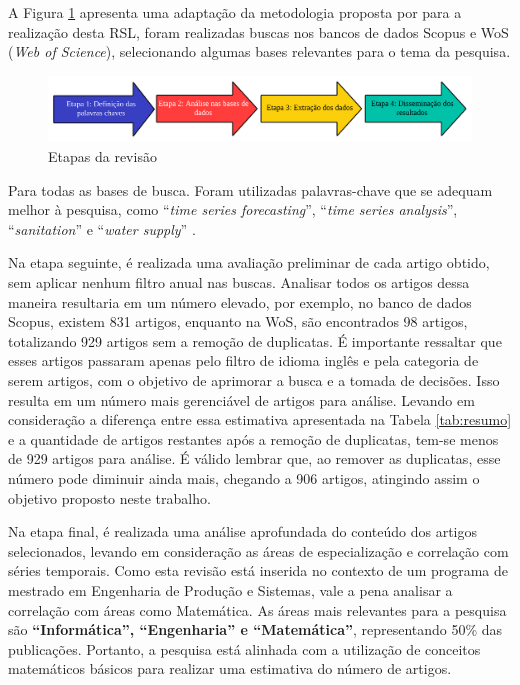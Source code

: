A Figura \ref{fig:rsl} apresenta uma adaptação da metodologia proposta por  para a realização desta RSL, foram realizadas buscas nos bancos de dados Scopus e WoS (\textit{Web of Science}), selecionando algumas bases relevantes para o tema da pesquisa.

\begin{figure}[H]
	\centering
	\caption{Etapas da revisão}
	\label{fig:rsl}
	\includegraphics[width=\linewidth]{Revisao/Figuras/RSL}
	
\end{figure}

Para todas as bases de busca. Foram utilizadas palavras-chave que se adequam melhor à pesquisa, como ``\textit{time series forecasting}'', ``\textit{time series analysis}'', ``\textit{sanitation}'' e ``\textit{water supply}'' .


Na etapa seguinte, é realizada uma avaliação preliminar de cada artigo obtido, sem aplicar nenhum filtro anual nas buscas. Analisar todos os artigos dessa maneira resultaria em um número elevado, por exemplo, no banco de dados Scopus, existem 831 artigos, enquanto na WoS, são encontrados 98 artigos, totalizando 929 artigos sem a remoção de duplicatas. É importante ressaltar que esses artigos passaram apenas pelo filtro de idioma inglês e pela categoria de serem artigos, com o objetivo de aprimorar a busca e a tomada de decisões. Isso resulta em um número mais gerenciável de artigos para análise. Levando em consideração a diferença entre essa estimativa apresentada na Tabela \ref{tab:resumo} e a quantidade de artigos restantes após a remoção de duplicatas, tem-se menos de 929 artigos para análise. É válido lembrar que, ao remover as duplicatas, esse número pode diminuir ainda mais, chegando a 906 artigos, atingindo assim o objetivo proposto neste trabalho.

Na etapa final, é realizada uma análise aprofundada do conteúdo dos artigos selecionados, levando em consideração as áreas de especialização e correlação com séries temporais. Como esta revisão está inserida no contexto de um programa de mestrado em Engenharia de Produção e Sistemas, vale a pena analisar a correlação com áreas como Matemática. As áreas mais relevantes para a pesquisa são \textbf{``Informática'', ``Engenharia'' e ``Matemática''}, representando 50\% das publicações. Portanto, a pesquisa está alinhada com a utilização de conceitos matemáticos básicos para realizar uma estimativa do número de artigos.


